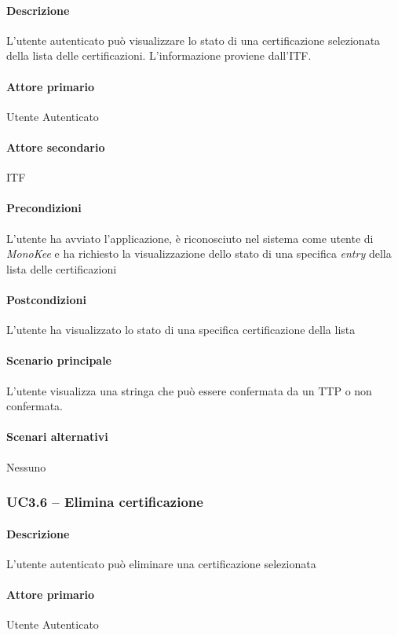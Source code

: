 \paragraph{Descrizione}  L’utente autenticato può visualizzare lo stato di una certificazione selezionata della lista delle certificazioni. L’informazione proviene dall’ITF.
\paragraph{Attore primario}  Utente Autenticato
\paragraph{Attore secondario}  ITF
\paragraph{Precondizioni} L’utente ha avviato l’applicazione, è riconosciuto nel sistema come utente di \textit{MonoKee} e ha richiesto la visualizzazione dello stato di una specifica \textit{entry} della lista delle certificazioni
\paragraph{Postcondizioni}  L’utente ha visualizzato lo stato di una specifica certificazione della lista
\paragraph{Scenario principale}  
L’utente visualizza una stringa che può essere confermata da un TTP o non confermata.
\paragraph{Scenari alternativi}  Nessuno



\subsubsection{UC3.6 – Elimina certificazione}
\paragraph{Descrizione}  L’utente autenticato può eliminare una certificazione selezionata
\paragraph{Attore primario}  Utente Autenticato
